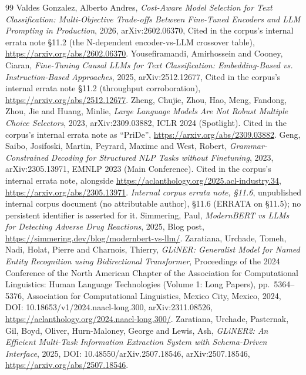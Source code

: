 \documentclass[10pt]{article}
\begin{document}
\begin{thebibliography}{99}
 Valdes Gonzalez, Alberto Andres, \emph{Cost-Aware Model Selection for Text Classification: Multi-Objective Trade-offs Between Fine-Tuned Encoders and {LLM} Prompting in Production}, 2026, arXiv:2602.06370, Cited in the corpus's internal errata note \S11.2 (the N-dependent encoder-vs-LLM crossover table), \url{https://arxiv.org/abs/2602.06370}.
 Yousefiramandi, Amirhossein and Cooney, Ciaran, \emph{Fine-Tuning Causal {LLM}s for Text Classification: Embedding-Based vs. Instruction-Based Approaches}, 2025, arXiv:2512.12677, Cited in the corpus's internal errata note \S11.2 (throughput corroboration), \url{https://arxiv.org/abs/2512.12677}.
 Zheng, Chujie, Zhou, Hao, Meng, Fandong, Zhou, Jie and Huang, Minlie, \emph{Large Language Models Are Not Robust Multiple Choice Selectors}, 2023, arXiv:2309.03882, ICLR 2024 (Spotlight). Cited in the corpus's internal errata note as ``PriDe'', \url{https://arxiv.org/abs/2309.03882}.
 Geng, Saibo, Josifoski, Martin, Peyrard, Maxime and West, Robert, \emph{Grammar-Constrained Decoding for Structured {NLP} Tasks without Finetuning}, 2023, arXiv:2305.13971, EMNLP 2023 (Main Conference). Cited in the corpus's internal errata note, alongside \url{https://aclanthology.org/2025.acl-industry.34}, \url{https://arxiv.org/abs/2305.13971}.
 \emph{Internal corpus errata note, \S11.6}, unpublished internal corpus document (no attributable author), \S11.6 (ERRATA on \S11.5); no persistent identifier is asserted for it.
 Simmering, Paul, \emph{{ModernBERT} vs {LLMs} for Detecting Adverse Drug Reactions}, 2025, Blog post, \url{https://simmering.dev/blog/modernbert-vs-llm/}.
 Zaratiana, Urchade, Tomeh, Nadi, Holat, Pierre and Charnois, Thierry, \emph{{GLiNER}: Generalist Model for Named Entity Recognition using Bidirectional Transformer}, Proceedings of the 2024 Conference of the North American Chapter of the Association for Computational Linguistics: Human Language Technologies (Volume 1: Long Papers), pp.~5364--5376, Association for Computational Linguistics, Mexico City, Mexico, 2024, DOI: 10.18653/v1/2024.naacl-long.300, arXiv:2311.08526, \url{https://aclanthology.org/2024.naacl-long.300/}.
 Zaratiana, Urchade, Pasternak, Gil, Boyd, Oliver, Hurn-Maloney, George and Lewis, Ash, \emph{{GLiNER2}: An Efficient Multi-Task Information Extraction System with Schema-Driven Interface}, 2025, DOI: 10.48550/arXiv.2507.18546, arXiv:2507.18546, \url{https://arxiv.org/abs/2507.18546}.

\end{thebibliography}
\end{document}
